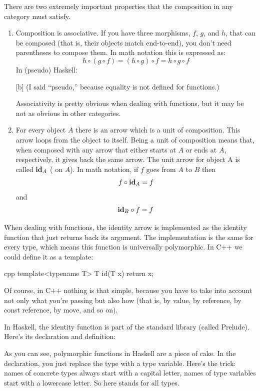 There are two extremely important properties that the composition in any
category must satisfy.

\begin{enumerate}
  \item
        Composition is associative. If you have three morphisms, $f$, $g$, and $h$,
        that can be composed (that is, their objects match end-to-end), you
        don't need parentheses to compose them. In math notation this is
        expressed as:
        \[h \circ (g \circ f) = (h \circ g) \circ f = h \circ g \circ f\]
        In (pseudo) Haskell:

        [b]
        (I said ``pseudo,'' because equality is not defined for functions.)

        Associativity is pretty obvious when dealing with functions, but it may
        be not as obvious in other categories.

  \item
        For every object $A$ there is an arrow which is a unit of composition.
        This arrow loops from the object to itself. Being a unit of composition
        means that, when composed with any arrow that either starts at $A$ or ends
        at $A$, respectively, it gives back the same arrow. The unit arrow for
        object A is called $\idarrow[A]$ ( on $A$). In math
        notation, if $f$ goes from $A$ to $B$ then
        \[f \circ \idarrow[A] = f\]
        and
        \[\idarrow[B] \circ f = f\]
\end{enumerate}
When dealing with functions, the identity arrow is implemented as the
identity function that just returns back its argument. The
implementation is the same for every type, which means this function is
universally polymorphic. In C++ we could define it as a template:

\begin{snip}{cpp}
template<typename T> T id(T x) { return x; }
\end{snip}
Of course, in C++ nothing is that simple, because you have to take into
account not only what you're passing but also how (that is, by value, by
reference, by const reference, by move, and so on).

In Haskell, the identity function is part of the standard library
(called Prelude). Here's its declaration and definition:

As you can see, polymorphic functions in Haskell are a piece of cake. In
the declaration, you just replace the type with a type variable. Here's
the trick: names of concrete types always start with a capital letter,
names of type variables start with a lowercase letter. So here
 stands for all types.

